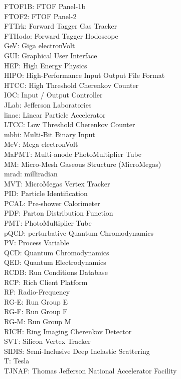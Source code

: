 {    FTOF1B:    FTOF Panel-1b \\
    FTOF2:     FTOF Panel-2 \\
    FTTrk:     Forward Tagger Gas Tracker \\
    FTHodo:    Forward Tagger Hodoscope \\
    GeV:       Giga electronVolt \\
    GUI:       Graphical User Interface \\
    HEP:       High Energy Physics \\
    HIPO:      High-Performance Input Output File Format \\
    HTCC:      High Threshold Cherenkov Counter \\
    IOC:       Input / Output Controller \\
    JLab:      Jefferson Laboratories \\
    linac:     Linear Particle Accelerator \\
    LTCC:      Low Threshold Cherenkov Counter \\
    mbbi:      Multi-Bit Binary Input \\
    MeV:       Mega electronVolt \\
    MaPMT:     Multi-anode PhotoMultiplier Tube \\
    MM:        Micro-Mesh Gaseous Structure (MicroMegas) \\
    mrad:      milliradian \\
    MVT:       MicroMegas Vertex Tracker \\
    PID:       Particle Identification \\
    PCAL:      Pre-shower Calorimeter \\
    PDF:       Parton Distribution Function \\
    PMT:       PhotoMultiplier Tube \\
    pQCD:      perturbative Quantum Chromodynamics \\
    PV:        Process Variable \\
    QCD:       Quantum Chromodynamics \\
    QED:       Quantum Electrodynamics \\
    RCDB:      Run Conditions Database \\
    RCP:       Rich Client Platform \\
    RF:        Radio-Frequency \\
    RG-E:      Run Group E \\
    RG-F:      Run Group F \\
    RG-M:      Run Group M \\
    RICH:      Ring Imaging Cherenkov Detector \\
    SVT:       Silicon Vertex Tracker \\
    SIDIS:     Semi-Inclusive Deep Inelastic Scattering \\
    T:         Tesla \\
    TJNAF:     Thomas Jefferson National Accelerator Facility

}
